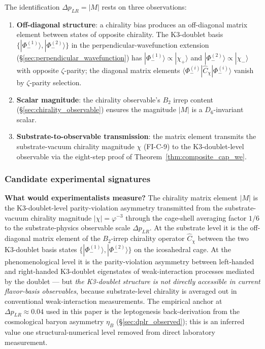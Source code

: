 \documentclass[11pt,letterpaper]{article}
\newcommand{\phig}{\varphi}
\newcommand{\DeltapLR}{\Delta p_{LR}}
\newcommand{\Cchi}{\hat{C}_\chi}
\newcommand{\PhiminusOne}{|\Phi_-^{(1)}\rangle}
\newcommand{\PhiminusTwo}{|\Phi_-^{(2)}\rangle}
\newcommand{\chiplus}{|\chi_+\rangle}
\newcommand{\chiminus}{|\chi_-\rangle}
\newcommand{\Dsix}{D_6}
\begin{document}
The identification $\DeltapLR = |M|$ rests on three observations:

\begin{enumerate}\setlength\itemsep{0.2em}
    \item \textbf{Off-diagonal structure}: a chirality bias produces an off-diagonal matrix element between states of opposite chirality. The K3-doublet basis $\{\PhiminusOne, \PhiminusTwo\}$ in the perpendicular-wavefunction extension (\S\ref{sec:perpendicular_wavefunction}) has $\PhiminusOne \propto \chiplus$ and $\PhiminusTwo \propto \chiminus$ with opposite $\zeta$-parity; the diagonal matrix elements $\langle \Phi_-^{(i)} | \Cchi | \Phi_-^{(i)} \rangle$ vanish by $\zeta$-parity selection.
    \item \textbf{Scalar magnitude}: the chirality observable's $B_2$ irrep content (\S\ref{sec:chirality_observable}) ensures the magnitude $|M|$ is a $\Dsix$-invariant scalar.
    \item \textbf{Substrate-to-observable transmission}: the matrix element transmits the substrate-vacuum chirality magnitude $\chi$ (FI-C-9) to the K3-doublet-level observable via the eight-step proof of Theorem~\ref{thm:composite_cap_we}.
\end{enumerate}

\subsubsection{Candidate experimental signatures}\label{sec:experimental_signature}

\textbf{What would experimentalists measure?} The chirality matrix element $|M|$ is the K3-doublet-level parity-violation asymmetry transmitted from the substrate-vacuum chirality magnitude $|\chi| = \phig^{-3}$ through the cage-shell averaging factor $1/6$ to the substrate-physics observable scale $\DeltapLR$. At the substrate level it is the off-diagonal matrix element of the $B_2$-irrep chirality operator $\Cchi$ between the two K3-doublet basis states $\{\PhiminusOne, \PhiminusTwo\}$ on the icosahedral cage. At the phenomenological level it is the parity-violation asymmetry between left-handed and right-handed K3-doublet eigenstates of weak-interaction processes mediated by the doublet --- but \emph{the K3-doublet structure is not directly accessible in current flavor-basis observables}, because substrate-level chirality is averaged out in conventional weak-interaction measurements. The empirical anchor at $\DeltapLR \approx 0.04$ used in this paper is the leptogenesis back-derivation from the cosmological baryon asymmetry $\eta_B$ (\S\ref{sec:dplr_observed}); this is an inferred value one structural-numerical level removed from direct laboratory measurement.
\end{document}
